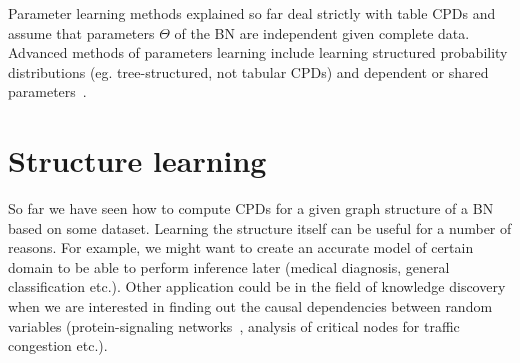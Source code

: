 \documentclass[english,cover]{fitthesis} %
\begin{document}
\medskip

Parameter learning methods explained so far deal strictly with table CPDs and assume that parameters $\Theta$ of the BN are independent given complete data. Advanced methods of parameters learning include learning structured probability distributions (eg. tree-structured, not tabular CPDs) and dependent or shared parameters~\cite{pgm}.

\section{Structure learning}
So far we have seen how to compute CPDs for a given graph structure of a BN based on some dataset. Learning the structure itself can be useful for a number of reasons. For example, we might want to create an accurate model of certain domain to be able to perform inference later (medical diagnosis, general classification etc.). Other application could be in the field of knowledge discovery when we are interested in finding out the causal dependencies between random variables (protein-signaling networks~\cite{sachs05}, analysis of critical nodes for traffic congestion etc.).
\end{document}
